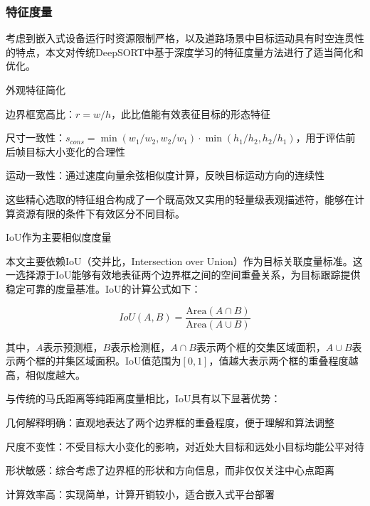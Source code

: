\documentclass[a4paper, UTF8, fontsize=12pt]{ctexart} %
\numberwithin{equation}{section} %
\begin{document}
\subsubsection{特征度量}

考虑到嵌入式设备运行时资源限制严格，以及道路场景中目标运动具有时空连贯性的特点，本文对传统DeepSORT中基于深度学习的特征度量方法进行了适当简化和优化。

\begin{parlist}

\item 外观特征简化

\begin{halfparlist}
    \item 边界框宽高比：$r = w/h$，此比值能有效表征目标的形态特征
    \item 尺寸一致性：$s_{cons} = \min(w_1/w_2, w_2/w_1) \cdot \min(h_1/h_2, h_2/h_1)$，用于评估前后帧目标大小变化的合理性
    \item 运动一致性：通过速度向量余弦相似度计算，反映目标运动方向的连续性
\end{halfparlist}

这些精心选取的特征组合构成了一个既高效又实用的轻量级表观描述符，能够在计算资源有限的条件下有效区分不同目标。

\item IoU作为主要相似度度量

本文主要依赖IoU（交并比，Intersection over Union）作为目标关联度量标准。这一选择源于IoU能够有效地表征两个边界框之间的空间重叠关系，为目标跟踪提供稳定可靠的度量基准。IoU的计算公式如下：

\begin{equation}
IoU(A, B) = \frac{\text{Area}(A \cap B)}{\text{Area}(A \cup B)}
\end{equation}

其中，$A$表示预测框，$B$表示检测框，$A \cap B$表示两个框的交集区域面积，$A \cup B$表示两个框的并集区域面积。IoU值范围为$[0,1]$，值越大表示两个框的重叠程度越高，相似度越大。

与传统的马氏距离等纯距离度量相比，IoU具有以下显著优势：

\begin{halfparlist}
\item 几何解释明确：直观地表达了两个边界框的重叠程度，便于理解和算法调整
\item 尺度不变性：不受目标大小变化的影响，对近处大目标和远处小目标均能公平对待
\item 形状敏感：综合考虑了边界框的形状和方向信息，而非仅仅关注中心点距离
\item 计算效率高：实现简单，计算开销较小，适合嵌入式平台部署
\end{halfparlist}


\end{parlist}
\end{document}
